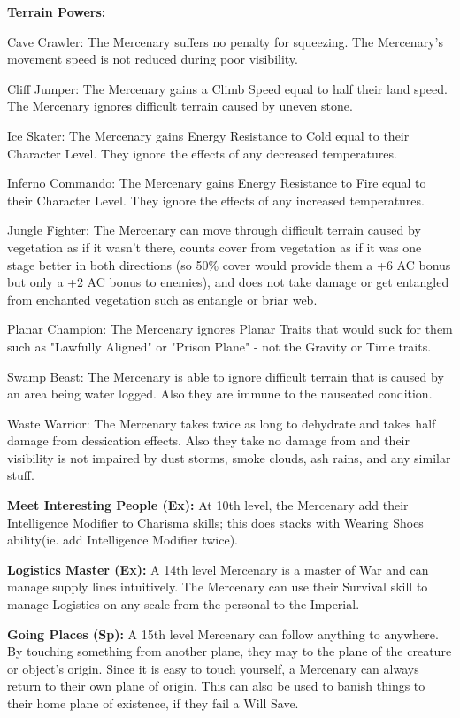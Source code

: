 \textbf{Terrain Powers:}
\begin{description*}
\item[Cave Crawler:] The Mercenary suffers no penalty for squeezing. The Mercenary's movement speed is not reduced during poor visibility.
\item[Cliff Jumper:] The Mercenary gains a Climb Speed equal to half their land speed. The Mercenary ignores difficult terrain caused by uneven stone.
\item[Ice Skater:] The Mercenary gains Energy Resistance to Cold equal to their Character Level. They ignore the effects of any decreased temperatures.
\item[Inferno Commando:] The Mercenary gains Energy Resistance to Fire equal to their Character Level. They ignore the effects of any increased temperatures.
\item[Jungle Fighter:] The Mercenary can move through difficult terrain caused by vegetation as if it wasn't there, counts cover from vegetation as if it was one stage better in both directions (so 50\% cover would provide them a +6 AC bonus but only a +2 AC bonus to enemies), and does not take damage or get entangled from enchanted vegetation such as entangle or briar web.
\item[Planar Champion:] The Mercenary ignores Planar Traits that would suck for them such as "Lawfully Aligned" or "Prison Plane" - not the Gravity or Time traits.
\item[Swamp Beast:] The Mercenary is able to ignore difficult terrain that is caused by an area being water logged. Also they are immune to the nauseated condition.
\item[Waste Warrior:] The Mercenary takes twice as long to dehydrate and takes half damage from dessication effects. Also they take no damage from and their visibility is not impaired by dust storms, smoke clouds, ash rains, and any similar stuff.
\end{description*}

\textbf{Meet Interesting People (Ex):} At 10th level, the Mercenary add their Intelligence Modifier to Charisma skills; this does stacks with Wearing Shoes ability(ie. add Intelligence Modifier twice).

\textbf{Logistics Master (Ex):} A 14th level Mercenary is a master of War and can manage supply lines intuitively. The Mercenary can use their Survival skill to manage Logistics on any scale from the personal to the Imperial.

\textbf{Going Places (Sp):} A 15th level Mercenary can follow anything to anywhere. By touching something from another plane, they may  to the plane of the creature or object's origin. Since it is easy to touch yourself, a Mercenary can always return to their own plane of origin. This can also be used to banish things to their home plane of existence, if they fail a Will Save.

